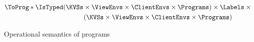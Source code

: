 \begin{figure}
\[
    \ToProg*{}  
    \IsTyped 
    \begin{gathered}[t]
    (\KVSs \times \ViewEnvs \times \ClientEnvs \times \Programs)
    \times \Labels \times {}
    \\ (\KVSs \times \ViewEnvs \times \ClientEnvs \times \Programs)
     \end{gathered}
\]

\begin{mathpar}
%
\end{mathpar}

\hrulefill

\caption{Operational semantics of programs}
\label{fig:program-semantics}
\end{figure}
